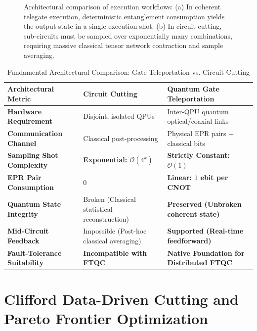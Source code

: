 \begin{figure}[htbp]
    \caption{Architectural comparison of execution workflows: (a) In coherent telegate execution, deterministic entanglement consumption yields the output state in a single execution shot. (b) In circuit cutting, sub-circuits must be sampled over exponentially many combinations, requiring massive classical tensor network contraction and sample averaging.}
    \label{fig:cutting_vs_telegate_pipeline_detailed}
\end{figure}

\begin{table}[htbp]
\centering
\caption{Fundamental Architectural Comparison: Gate Teleportation vs. Circuit Cutting}
\label{tab:teleportation_vs_cutting_master}
\begin{tabularx}{\textwidth}{l X X}
\toprule
\textbf{Architectural Metric} & \textbf{Circuit Cutting} & \textbf{Quantum Gate Teleportation} \\
\midrule
\textbf{Hardware Requirement} & Disjoint, isolated QPUs & Inter-QPU quantum optical/coaxial links \\
\textbf{Communication Channel} & Classical post-processing & Physical EPR pairs + classical bits \\
\textbf{Sampling Shot Complexity} & \textbf{Exponential: $\mathcal{O}(4^k)$} & \textbf{Strictly Constant: $\mathcal{O}(1)$} \\
\textbf{EPR Pair Consumption} & 0 & \textbf{Linear: $1$ ebit per CNOT} \\
\textbf{Quantum State Integrity} & Broken (Classical statistical reconstruction) & \textbf{Preserved (Unbroken coherent state)} \\
\textbf{Mid-Circuit Feedback} & Impossible (Post-hoc classical averaging) & \textbf{Supported (Real-time feedforward)} \\
\textbf{Fault-Tolerance Suitability} & \textbf{Incompatible with FTQC} & \textbf{Native Foundation for Distributed FTQC} \\
\bottomrule
\end{tabularx}
\end{table}

\section{Clifford Data-Driven Cutting and Pareto Frontier Optimization}
\label{sec:cddc_pareto_frontier}

